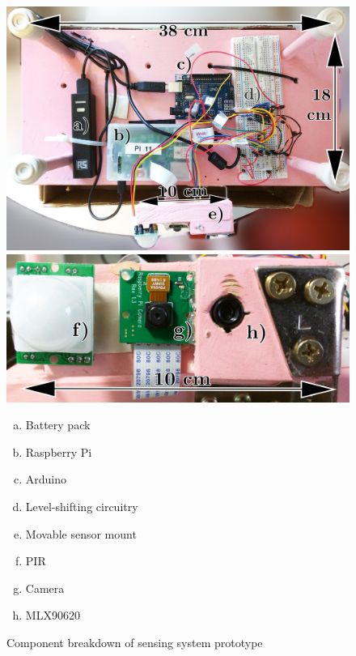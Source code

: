 \documentclass[../thesis/thesis.tex]{subfiles}
\begin{document}
\begin{figure}
\centering
\includegraphics[width=\textwidth]{../diagrams/prototypeb-1.jpg}
\includegraphics[width=\textwidth]{../diagrams/prototypeb-2.jpg}
{\footnotesize
\begin{multicols}{3}
\begin{enumerate}[a)]
 \item Battery pack
 \item Raspberry Pi
 \item Arduino
 \item Level-shifting circuitry
 \item Movable sensor mount
 \item PIR
 \item Camera
 \item MLX90620
\end{enumerate}
\end{multicols}
}
\caption{Component breakdown of sensing system prototype}
\label{fig:pictures:protob1}
\end{figure}
\end{document}
